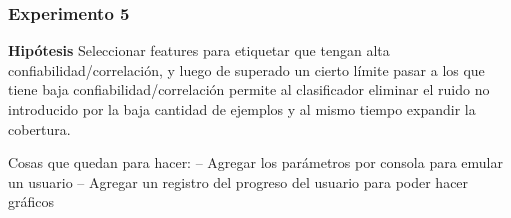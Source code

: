\subsubsection{Experimento 5}
\textbf{Hipótesis} Seleccionar features para etiquetar que tengan alta confiabilidad/correlación, y luego de superado un cierto límite pasar a los que tiene baja confiabilidad/correlación permite al clasificador eliminar el ruido no introducido por la baja cantidad de ejemplos y al mismo tiempo expandir la cobertura.


Cosas que quedan para hacer:
	-- Agregar los parámetros por consola para emular un usuario
	-- Agregar un registro del progreso del usuario para poder hacer gráficos
